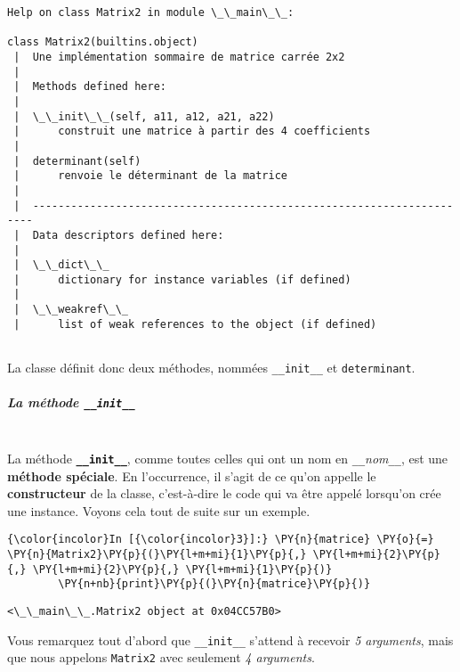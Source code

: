     \begin{Verbatim}[commandchars=\\\{\}]
Help on class Matrix2 in module \_\_main\_\_:

class Matrix2(builtins.object)
 |  Une implémentation sommaire de matrice carrée 2x2
 |  
 |  Methods defined here:
 |  
 |  \_\_init\_\_(self, a11, a12, a21, a22)
 |      construit une matrice à partir des 4 coefficients
 |  
 |  determinant(self)
 |      renvoie le déterminant de la matrice
 |  
 |  ----------------------------------------------------------------------
 |  Data descriptors defined here:
 |  
 |  \_\_dict\_\_
 |      dictionary for instance variables (if defined)
 |  
 |  \_\_weakref\_\_
 |      list of weak references to the object (if defined)


    \end{Verbatim}

    La classe définit donc deux méthodes, nommées \texttt{\_\_init\_\_} et
\texttt{determinant}.

    \hypertarget{la-muxe9thode-__init__}{%
\subparagraph{\texorpdfstring{La méthode
\texttt{\_\_init\_\_}\\\\}{La méthode \_\_init\_\_}}\label{la-muxe9thode-__init__}}

    La méthode \textbf{\texttt{\_\_init\_\_}}, comme toutes celles qui ont
un nom en \texttt{\_\_}\emph{nom}\texttt{\_\_}, est une \textbf{méthode
spéciale}. En l'occurrence, il s'agit de ce qu'on appelle le
\textbf{constructeur} de la classe, c'est-à-dire le code qui va être
appelé lorsqu'on crée une instance. Voyons cela tout de suite sur un
exemple.

    \begin{Verbatim}[commandchars=\\\{\}]
{\color{incolor}In [{\color{incolor}3}]:} \PY{n}{matrice} \PY{o}{=} \PY{n}{Matrix2}\PY{p}{(}\PY{l+m+mi}{1}\PY{p}{,} \PY{l+m+mi}{2}\PY{p}{,} \PY{l+m+mi}{2}\PY{p}{,} \PY{l+m+mi}{1}\PY{p}{)}
        \PY{n+nb}{print}\PY{p}{(}\PY{n}{matrice}\PY{p}{)}
\end{Verbatim}


    \begin{Verbatim}[commandchars=\\\{\}]
<\_\_main\_\_.Matrix2 object at 0x04CC57B0>

    \end{Verbatim}

    Vous remarquez tout d'abord que \texttt{\_\_init\_\_} s'attend à
recevoir \emph{5 arguments}, mais que nous appelons \texttt{Matrix2}
avec seulement \emph{4 arguments}.\\


